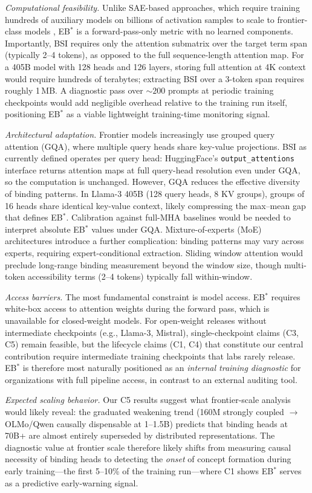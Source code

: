 \documentclass[10pt]{article} %
\begin{document}
\begin{enumerate}
  \emph{Computational feasibility.} Unlike SAE-based approaches, which require training hundreds of auxiliary models on billions of activation samples to scale to frontier-class models \citep{templeton2024monosemanticity,lieberum2024gemma}, EB$^*$ is a forward-pass-only metric with no learned components. Importantly, BSI requires only the attention submatrix over the target term span (typically 2--4 tokens), as opposed to the full sequence-length attention map. For a 405B model with 128 heads and 126 layers, storing full attention at 4K context would require hundreds of terabytes; extracting BSI over a 3-token span requires roughly 1\,MB. A diagnostic pass over ${\sim}200$ prompts at periodic training checkpoints would add negligible overhead relative to the training run itself, positioning EB$^*$ as a viable lightweight training-time monitoring signal.

  \emph{Architectural adaptation.} Frontier models increasingly use grouped query attention (GQA), where multiple query heads share key-value projections. BSI as currently defined operates per query head: HuggingFace's \texttt{output\_attentions} interface returns attention maps at full query-head resolution even under GQA, so the computation is unchanged. However, GQA reduces the effective diversity of binding patterns. In Llama-3 405B (128 query heads, 8 KV groups), groups of 16 heads share identical key-value context, likely compressing the max--mean gap that defines EB$^*$. Calibration against full-MHA baselines would be needed to interpret absolute EB$^*$ values under GQA. Mixture-of-experts (MoE) architectures introduce a further complication: binding patterns may vary across experts, requiring expert-conditional extraction. Sliding window attention would preclude long-range binding measurement beyond the window size, though multi-token accessibility terms (2--4 tokens) typically fall within-window.

  \emph{Access barriers.} The most fundamental constraint is model access. EB$^*$ requires white-box access to attention weights during the forward pass, which is unavailable for closed-weight models. For open-weight releases without intermediate checkpoints (e.g., Llama-3, Mistral), single-checkpoint claims (C3, C5) remain feasible, but the lifecycle claims (C1, C4) that constitute our central contribution require intermediate training checkpoints that labs rarely release. EB$^*$ is therefore most naturally positioned as an \emph{internal training diagnostic} for organizations with full pipeline access, in contrast to an external auditing tool.

  \emph{Expected scaling behavior.} Our C5 results suggest what frontier-scale analysis would likely reveal: the graduated weakening trend (160M strongly coupled $\to$ OLMo/Qwen causally dispensable at 1--1.5B) predicts that binding heads at 70B+ are almost entirely superseded by distributed representations. The diagnostic value at frontier scale therefore likely shifts from measuring causal necessity of binding heads to detecting the \emph{onset} of concept formation during early training---the first 5--10\% of the training run---where C1 shows EB$^*$ serves as a predictive early-warning signal.
\end{enumerate}
\end{document}
